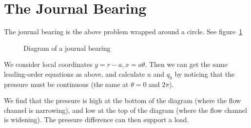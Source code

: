 \documentclass[../Main.tex]{subfiles}
\begin{document}
\section{The Journal Bearing}
The journal bearing is the above problem wrapped around a circle. See figure~\ref{figJournalBearing}
\begin{figure}
    \centering
    \caption{Diagram of a journal bearing}
    \label{figJournalBearing}
\end{figure}
We consider local coordinates $y = r-a, x = a\theta$. Then we can get the same leading-order equations as above, and calculate $u$ and $q_0$ by noticing that the pressure must be continuous (the same at $\theta = 0$ and $2\pi$).

We find that the pressure is high at the bottom of the diagram (where the flow channel is narrowing), and low at the top of the diagram (where the flow channel is widening). The pressure difference can then support a load.
\end{document}

